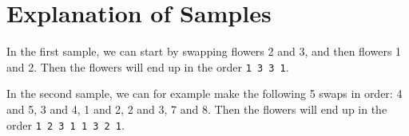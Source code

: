 \section*{Explanation of Samples}
In the first sample, we can start by swapping flowers 2 and 3, and then flowers 1 and 2.
Then the flowers will end up in the order \texttt{1 3 3 1}.

In the second sample, we can for example make the following 5 swaps in order:
4 and 5, 3 and 4, 1 and 2, 2 and 3, 7 and 8.
Then the flowers will end up in the order \texttt{1 2 3 1 1 3 2 1}.
